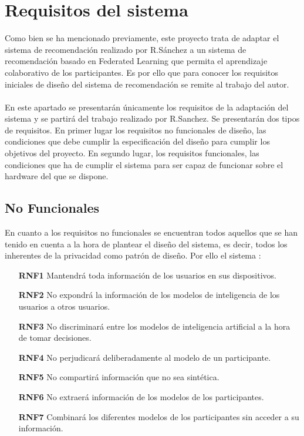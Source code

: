 \section{Requisitos del sistema}
Como bien se ha mencionado previamente, este proyecto trata de adaptar el sistema de recomendación realizado por R.Sánchez \autocite{sanchez-corcueraPersuasionbasedRecommenderSystem2020} a un sistema de recomendación basado en Federated Learning que permita el aprendizaje colaborativo de los participantes. Es por ello que para conocer los requisitos iniciales de diseño del sistema de recomendación se remite al trabajo del autor.
\\ \\
En este apartado se presentarán únicamente los requisitos de la adaptación del sistema y se partirá del trabajo realizado por R.Sanchez. Se presentarán dos tipos de requisitos. En primer lugar los requisitos no funcionales de diseño, las condiciones que debe cumplir la especificación del diseño para cumplir los objetivos del proyecto. En segundo lugar, los requisitos funcionales, las condiciones que ha de cumplir el sistema para ser capaz de funcionar sobre el hardware del que se dispone.

\subsection{No Funcionales}
En cuanto a los requisitos no funcionales se encuentran todos aquellos que se han tenido en cuenta a la hora de plantear el diseño del sistema, es decir, todos los inherentes de la privacidad como patrón de diseño. Por ello el sistema :
\begin{itemize}
    \item [\textbf{RNF1}] Mantendrá toda información de los usuarios en sus dispositivos.
    \item [\textbf{RNF2}] No expondrá la información de los modelos de inteligencia de los usuarios a otros usuarios.
    \item [\textbf{RNF3}] No discriminará entre los modelos de inteligencia artificial a la hora de tomar decisiones.
    \item [\textbf{RNF4}] No perjudicará deliberadamente al modelo de un participante.
    \item [\textbf{RNF5}] No compartirá información que no sea sintética.
    \item [\textbf{RNF6}] No extraerá información de los modelos de los participantes.
    \item [\textbf{RNF7}] Combinará los diferentes modelos de los participantes sin acceder a su información.
\end{itemize}
